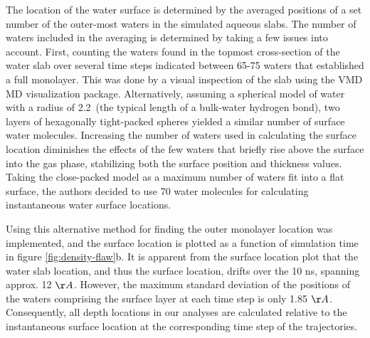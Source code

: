 The location of the water surface is determined by the averaged positions of a set number of the outer-most waters in the simulated aqueous slabs. The number of waters included in the averaging is determined by taking a few issues into account.  First, counting the waters found in the topmost cross-section of the water slab over several time steps indicated between 65-75 waters that established a full monolayer. This was done by a visual inspection of the slab using the VMD MD visualization package.\cite{HUMP96} Alternatively, assuming a spherical model of water with a radius of 2.2\angs~(the typical length of a bulk-water hydrogen bond), two layers of hexagonally tight-packed spheres yielded a similar number of surface water molecules. Increasing the number of waters used in calculating the surface location diminishes the effects of the few waters that briefly rise above the surface into the gas phase, stabilizing both the surface position and thickness values. Taking the close-packed model as a maximum number of waters fit into a flat surface, the authors decided to use 70 water molecules for calculating instantaneous water surface locations. 
  
Using this alternative method for finding the outer monolayer location was implemented, and the surface location is plotted as a function of simulation time in figure \ref{fig:density-flaw}b. It is apparent from the surface location plot that the water slab location, and thus the surface location, drifts over the 10 ns, spanning approx. 12 $\AA$. However, the maximum standard deviation of the positions of the waters comprising the surface layer at each time step is only 1.85 $\AA$. Consequently, all depth locations in our analyses are calculated relative to the instantaneous surface location at the corresponding time step of the trajectories.

